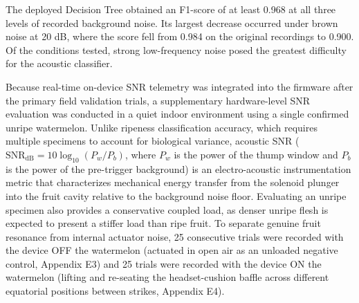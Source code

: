 \begin{thesisprose}
The deployed Decision Tree obtained an F1-score of at least 0.968 at all three levels of recorded background noise. Its largest decrease occurred under brown noise at 20 dB, where the score fell from 0.984 on the original recordings to 0.900. Of the conditions tested, strong low-frequency noise posed the greatest difficulty for the acoustic classifier.

Because real-time on-device SNR telemetry was integrated into the firmware after the primary field validation trials, a supplementary hardware-level SNR evaluation was conducted in a quiet indoor environment using a single confirmed unripe watermelon. Unlike ripeness classification accuracy, which requires multiple specimens to account for biological variance, acoustic SNR ($\mathrm{SNR}_{\mathrm{dB}} = 10\log_{10}(P_w/P_b)$, where $P_w$ is the power of the thump window and $P_b$ is the power of the pre-trigger background) is an electro-acoustic instrumentation metric that characterizes mechanical energy transfer from the solenoid plunger into the fruit cavity relative to the background noise floor. Evaluating an unripe specimen also provides a conservative coupled load, as denser unripe flesh is expected to present a stiffer load than ripe fruit. To separate genuine fruit resonance from internal actuator noise, 25 consecutive trials were recorded with the device OFF the watermelon (actuated in open air as an unloaded negative control, Appendix E3) and 25 trials were recorded with the device ON the watermelon (lifting and re-seating the headset-cushion baffle across different equatorial positions between strikes, Appendix E4).


\end{thesisprose}
